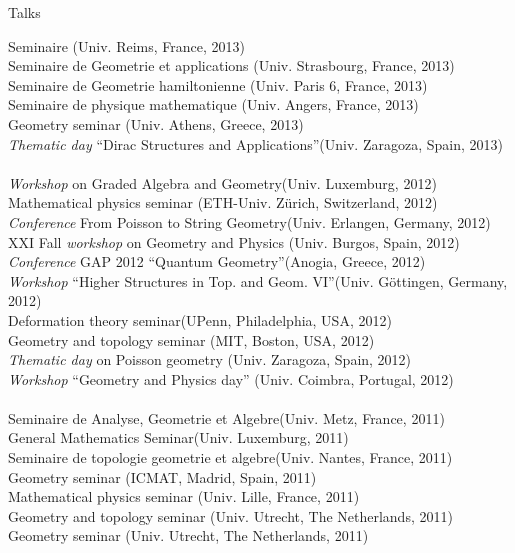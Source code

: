 \documentclass[12p]{resume}
\begin{document}
\begin{category}{Talks}
\begin{tabbing}
Seminaire    \>(Univ. Reims, France, 2013)\\
Seminaire de  Geometrie et applications  \>(Univ. Strasbourg, France, 2013)\\
Seminaire de  Geometrie hamiltonienne \>(Univ. Paris 6, France, 2013)\\
Seminaire de physique mathematique \>(Univ. Angers, France, 2013)\\
Geometry  seminar \>(Univ. Athens, Greece, 2013)\\
\emph{Thematic day} ``Dirac Structures and Applications''\>(Univ. Zaragoza, Spain, 2013)\\
\>\\
\emph{Workshop} on Graded Algebra and Geometry\>(Univ. Luxemburg, 2012)\\
Mathematical physics seminar \>(ETH-Univ. Z\"urich, Switzerland, 2012)\\
\emph{Conference} From Poisson to String Geometry\>(Univ. Erlangen, Germany, 2012)\\
XXI   Fall \emph{workshop} on Geometry and Physics \> (Univ. Burgos, Spain, 2012)\\
\emph{Conference} GAP 2012 ``Quantum Geometry''\>(Anogia, Greece, 2012)\\
\emph{Workshop} ``Higher Structures in Top. and Geom. VI''\>(Univ. G\"ottingen, Germany, 2012)\\
Deformation theory seminar\>(UPenn, Philadelphia, USA, 2012)\\
Geometry and topology seminar \>(MIT, Boston, USA, 2012)\\
\emph{Thematic day} on Poisson geometry \>(Univ. Zaragoza, Spain, 2012)\\
\emph{Workshop} ``Geometry and Physics day'' \>(Univ. Coimbra, Portugal, 2012)\\
\>\\
Seminaire de Analyse, Geometrie et Algebre\>(Univ. Metz, France, 2011)\\
General Mathematics Seminar\>(Univ. Luxemburg, 2011)\\
Seminaire de topologie geometrie et algebre\>(Univ. Nantes, France, 2011)\\
Geometry seminar \>(ICMAT, Madrid, Spain, 2011)\\
Mathematical physics seminar \>(Univ. Lille, France, 2011)\\
Geometry and topology seminar \>(Univ. Utrecht, The Netherlands, 2011)\\
Geometry seminar \>(Univ. Utrecht, The Netherlands, 2011)\\

\end{tabbing}
\end{category}
\end{document}
